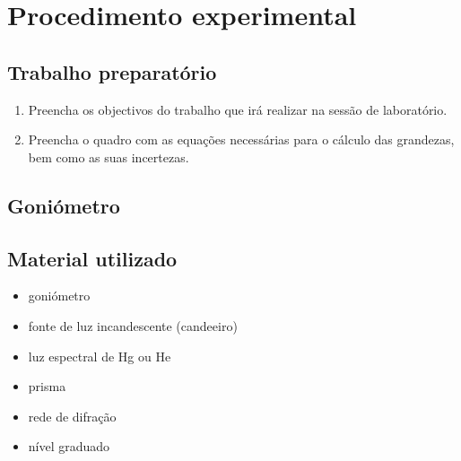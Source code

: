 \documentclass[12pt,a4paper,oneside]{paper}
\begin{document}
\newpage
\section{\sf Procedimento experimental}

\subsection{\sf Trabalho preparatório} 
\begin{enumerate}
\item Preencha os objectivos do trabalho que irá realizar na sessão de laboratório. 
\item Preencha o quadro com as equações necessárias para o cálculo das grandezas, bem como as suas incertezas. 
\end{enumerate}

\subsection{\sf Goniómetro}

\subsection*{\sf Material utilizado}

\begin{itemize}
\item goniómetro
\item fonte de luz incandescente (candeeiro)
\item luz espectral de Hg ou He
\item prisma
\item rede de difração
\item nível graduado
\end{itemize}

\\
\end{document}
